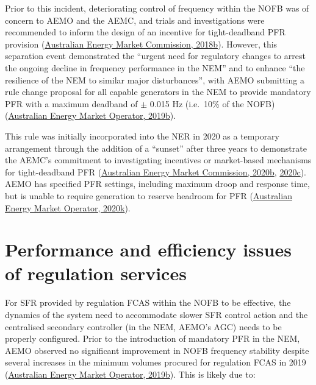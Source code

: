 \documentclass[12pt,a4paper,]{report}
\begin{document}
Prior to this incident, deteriorating control of frequency within the
NOFB was of concern to AEMO and the AEMC, and trials and investigations
were recommended to inform the design of an incentive for tight-deadband
PFR provision
(\protect\hyperlink{ref-australianenergymarketcommissionFrequencyControlFrameworks2018}{Australian
Energy Market Commission, 2018b}). However, this separation event
demonstrated the ``urgent need for regulatory changes to arrest the
ongoing decline in frequency performance in the NEM'' and to enhance
``the resilience of the NEM to similar major disturbances'', with AEMO
submitting a rule change proposal for all capable generators in the NEM
to provide mandatory PFR with a maximum deadband of \(\pm\) 0.015 Hz
(i.e.~10\% of the NOFB)
(\protect\hyperlink{ref-australianenergymarketoperatorElectricityRuleChange2019}{Australian
Energy Market Operator, 2019b}).

This rule was initially incorporated into the NER in 2020 as a temporary
arrangement through the addition of a ``sunset'' after three years to
demonstrate the AEMC's commitment to investigating incentives or
market-based mechanisms for tight-deadband PFR
(\protect\hyperlink{ref-australianenergymarketcommissionMandatoryPrimaryFrequency2020}{Australian
Energy Market Commission, 2020b},
\protect\hyperlink{ref-australianenergymarketcommissionFrequencyControlRule2020}{2020c}).
AEMO has specified PFR settings, including maximum droop and response
time, but is unable to require generation to reserve headroom for PFR
(\protect\hyperlink{ref-australianenergymarketoperatorInterimPrimaryFrequency2020}{Australian
Energy Market Operator, 2020k}).

\hypertarget{sec:fcs-regulation}{%
\section{Performance and efficiency issues of regulation
services}\label{sec:fcs-regulation}}

For SFR provided by regulation FCAS within the NOFB to be effective, the
dynamics of the system need to accommodate slower SFR control action and
the centralised secondary controller (in the NEM, AEMO's AGC) needs to
be properly configured. Prior to the introduction of mandatory PFR in
the NEM, AEMO observed no significant improvement in NOFB frequency
stability despite several increases in the minimum volumes procured for
regulation FCAS in 2019
(\protect\hyperlink{ref-australianenergymarketoperatorElectricityRuleChange2019}{Australian
Energy Market Operator, 2019b}). This is likely due to:
\end{document}
